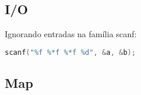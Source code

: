 \documentclass[a4paper,twocolumn, 10pt, landscape]{article}
\begin{document}
\subsection{I/O}
Ignorando entradas na família scanf:
\begin{lstlisting}[language=c, label=cio, caption={Ignora os dois floats do meio. Retornará 2 no sucesso.}]
 scanf("%f %*f %*f %d", &a, &b);
\end{lstlisting}


\subsection{Map}

\end{document}
